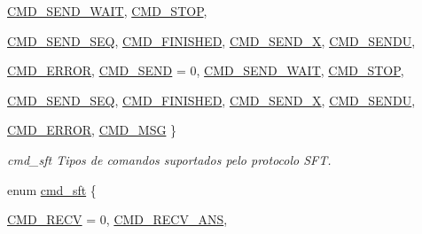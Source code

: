 \begin{DoxyCompactItemize}
\hyperlink{group__tools_ga698dfd82c5a5a0fa6dee46c157bc2e4fa0528f4b967392245553f29c25b8a881a}{CMD\_\-SEND\_\-WAIT}, 
\hyperlink{group__tools_ga698dfd82c5a5a0fa6dee46c157bc2e4fa1e0ceff2d6f13742786f42dac58149bc}{CMD\_\-STOP}, 
\par
\hyperlink{group__tools_ga698dfd82c5a5a0fa6dee46c157bc2e4fa4360eb301345df97962cb1464ee8473a}{CMD\_\-SEND\_\-SEQ}, 
\hyperlink{group__tools_ga698dfd82c5a5a0fa6dee46c157bc2e4fa4fe06469b0604dc5a26a64882560c5da}{CMD\_\-FINISHED}, 
\hyperlink{group__tools_ga698dfd82c5a5a0fa6dee46c157bc2e4fa615aafaeecf11e971ebdddf41bde2e17}{CMD\_\-SEND\_\-X}, 
\hyperlink{group__tools_ga698dfd82c5a5a0fa6dee46c157bc2e4faa7a0078d43616f6ad11c7429303070fb}{CMD\_\-SENDU}, 
\par
\hyperlink{group__tools_ga698dfd82c5a5a0fa6dee46c157bc2e4fa3e631e656523983cc0e572e93cae27c6}{CMD\_\-ERROR}, 
\hyperlink{group__tools_ga698dfd82c5a5a0fa6dee46c157bc2e4fa00c26130ae6ce63965ca64eb0010508f}{CMD\_\-SEND} = 0, 
\hyperlink{group__tools_ga698dfd82c5a5a0fa6dee46c157bc2e4fa0528f4b967392245553f29c25b8a881a}{CMD\_\-SEND\_\-WAIT}, 
\hyperlink{group__tools_ga698dfd82c5a5a0fa6dee46c157bc2e4fa1e0ceff2d6f13742786f42dac58149bc}{CMD\_\-STOP}, 
\par
\hyperlink{group__tools_ga698dfd82c5a5a0fa6dee46c157bc2e4fa4360eb301345df97962cb1464ee8473a}{CMD\_\-SEND\_\-SEQ}, 
\hyperlink{group__tools_ga698dfd82c5a5a0fa6dee46c157bc2e4fa4fe06469b0604dc5a26a64882560c5da}{CMD\_\-FINISHED}, 
\hyperlink{group__tools_ga698dfd82c5a5a0fa6dee46c157bc2e4fa615aafaeecf11e971ebdddf41bde2e17}{CMD\_\-SEND\_\-X}, 
\hyperlink{group__tools_ga698dfd82c5a5a0fa6dee46c157bc2e4faa7a0078d43616f6ad11c7429303070fb}{CMD\_\-SENDU}, 
\par
\hyperlink{group__tools_ga698dfd82c5a5a0fa6dee46c157bc2e4fa3e631e656523983cc0e572e93cae27c6}{CMD\_\-ERROR}, 
\hyperlink{group__tools_ga698dfd82c5a5a0fa6dee46c157bc2e4fa384b8b0439817da86b68b1dad85c9993}{CMD\_\-MSG}
 \}
\begin{DoxyCompactList}\small\item\em cmd\_\-sft Tipos de comandos suportados pelo protocolo SFT. \item\end{DoxyCompactList}\item 
enum \hyperlink{group__tools_ga698dfd82c5a5a0fa6dee46c157bc2e4f}{cmd\_\-sft} \{ \par
\hyperlink{group__tools_ga698dfd82c5a5a0fa6dee46c157bc2e4fa91dd4f615594c8882f25e5457596ac25}{CMD\_\-RECV} = 0, 
\hyperlink{group__tools_ga698dfd82c5a5a0fa6dee46c157bc2e4fabd786962c55320c4cb40358afaed468f}{CMD\_\-RECV\_\-ANS}, 

\end{DoxyCompactItemize}
